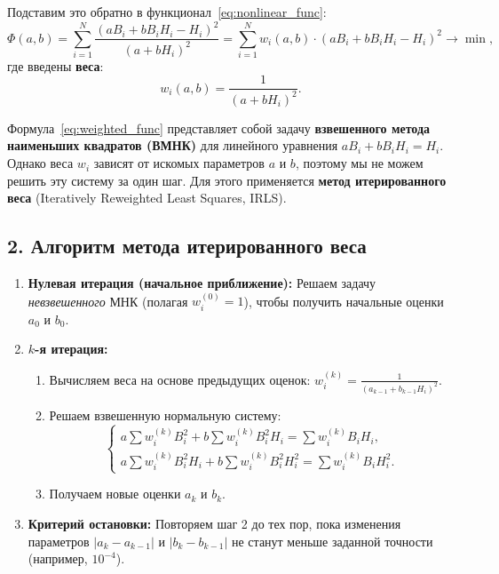\documentclass{article}
\begin{document}
Подставим это обратно в функционал~\eqref{eq:nonlinear_func}:
\begin{equation}
\Phi(a, b) = \sum_{i=1}^{N} \frac{(aB_i + bB_iH_i - H_i)^2}{(a + bH_i)^2} = \sum_{i=1}^{N} w_i(a, b) \cdot (aB_i + bB_iH_i - H_i)^2 \to \min,
\label{eq:weighted_func}
\end{equation}
где введены \textbf{веса}:
\begin{equation}
w_i(a, b) = \frac{1}{(a + bH_i)^2}.
\end{equation}

Формула~\eqref{eq:weighted_func} представляет собой задачу \textbf{взвешенного метода наименьших квадратов (ВМНК)} для линейного уравнения $aB_i + bB_iH_i = H_i$. Однако веса $w_i$ зависят от искомых параметров $a$ и $b$, поэтому мы не можем решить эту систему за один шаг. Для этого применяется \textbf{метод итерированного веса} (Iteratively Reweighted Least Squares, IRLS).

\subsection*{2. Алгоритм метода итерированного веса}

\begin{enumerate}
    \item \textbf{Нулевая итерация (начальное приближение):} Решаем задачу \textit{невзвешенного} МНК (полагая $w_i^{(0)} = 1$), чтобы получить начальные оценки $a_0$ и $b_0$.
    \item \textbf{$k$-я итерация:} 
    \begin{enumerate}
        \item Вычисляем веса на основе предыдущих оценок: $w_i^{(k)} = \frac{1}{(a_{k-1} + b_{k-1}H_i)^2}$.
        \item Решаем взвешенную нормальную систему:
        \begin{equation}
        \begin{cases}
        a \sum w_i^{(k)} B_i^2 + b \sum w_i^{(k)} B_i^2 H_i = \sum w_i^{(k)} B_i H_i, \\
        a \sum w_i^{(k)} B_i^2 H_i + b \sum w_i^{(k)} B_i^2 H_i^2 = \sum w_i^{(k)} B_i H_i^2.
        \end{cases}
        \end{equation}
        \item Получаем новые оценки $a_k$ и $b_k$.
    \end{enumerate}
    \item \textbf{Критерий остановки:} Повторяем шаг 2 до тех пор, пока изменения параметров $|a_k - a_{k-1}|$ и $|b_k - b_{k-1}|$ не станут меньше заданной точности (например, $10^{-4}$).
\end{enumerate}
\end{document}
